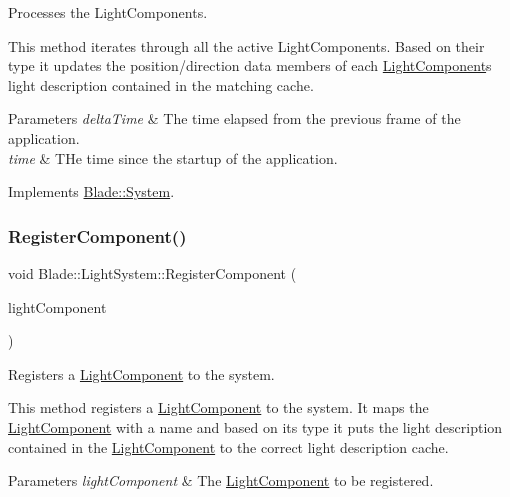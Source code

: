 Processes the Light\+Components. 

This method iterates through all the active Light\+Components. Based on their type it updates the position/direction data members of each \hyperlink{class_blade_1_1_light_component}{Light\+Component}\textquotesingle{}s light description contained in the matching cache. 
\begin{DoxyParams}{Parameters}
{\em delta\+Time} & The time elapsed from the previous frame of the application. \\
\hline
{\em time} & T\+He time since the startup of the application. \\
\hline
\end{DoxyParams}


Implements \hyperlink{class_blade_1_1_system_a80c186f5f9f8fa4fd317b861853fe6a8}{Blade\+::\+System}.

\mbox{\label{class_blade_1_1_light_system_a0d98342c2927dd165f41ccb50d4845ab}} 
\subsubsection{\texorpdfstring{Register\+Component()}{RegisterComponent()}}
{\footnotesize\ttfamily void Blade\+::\+Light\+System\+::\+Register\+Component (\begin{DoxyParamCaption}\item[{\hyperlink{class_blade_1_1_light_component}{Light\+Component} $\ast$}]{light\+Component }\end{DoxyParamCaption})\hspace{0.3cm}{\ttfamily [noexcept]}}



Registers a \hyperlink{class_blade_1_1_light_component}{Light\+Component} to the system. 

This method registers a \hyperlink{class_blade_1_1_light_component}{Light\+Component} to the system. It maps the \hyperlink{class_blade_1_1_light_component}{Light\+Component} with a name and based on it\textquotesingle{}s type it puts the light description contained in the \hyperlink{class_blade_1_1_light_component}{Light\+Component} to the correct light description cache. 
\begin{DoxyParams}{Parameters}
{\em light\+Component} & The \hyperlink{class_blade_1_1_light_component}{Light\+Component} to be registered. \\
\hline
\end{DoxyParams}
\mbox{\label{class_blade_1_1_light_system_a7f7a3500b1177ebde379b7fd54b3d16a}} 
